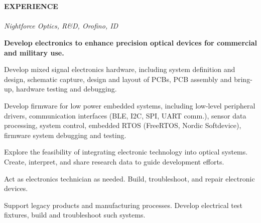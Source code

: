 \documentclass[10pt,letterpaper]{article}
\begin{document}
\hspace*{\fill}{\sl (509) 701-9014}	 \vspace{.3pc}\\ 
\hspace*{\fill}
\hspace{\fill}{\sl tedfernau@gmail.com}\\ 

\noindent\makebox[\linewidth]{\rule{\linewidth}{0.4pt}}

\vspace*{\fill}

{\noindent\sc\bf EXPERIENCE}\vspace{.3pc}\\
\indent{}	\hspace*{\fill}{ March 2018, current employer} \\
\indent\indent 
{\sl Nightforce Optics, R\&D, Orofino, ID}
				\vspace{0.1in}
                 \begin{itemize}[leftmargin=0.75in, rightmargin=0.25in, topsep=0mm,itemindent=0mm, label=\textrm{--}]
  {\small\sl
\item {\bf Develop electronics to enhance precision optical devices for commercial and military use.} 
\item Develop mixed signal electronics hardware, including system definition and design, schematic capture, design and layout of PCBs, PCB assembly and bring-up, hardware testing and debugging.
\item Develop firmware for low power embedded systems, including low-level peripheral drivers, communication interfaces (BLE, I2C, SPI, UART comm.), sensor data processing, system control, embedded RTOS (FreeRTOS, Nordic Softdevice), firmware system debugging and testing. 
\item Explore the feasibility of integrating electronic technology into optical systems. Create, interpret, and share research data to guide development efforts. 
\item Act as electronics technician as needed. Build, troubleshoot, and repair electronic devices.
\item Support legacy products and manufacturing processes. Develop electrical test fixtures, build and troubleshoot such systems. 
}
\end{itemize}
\end{document}
